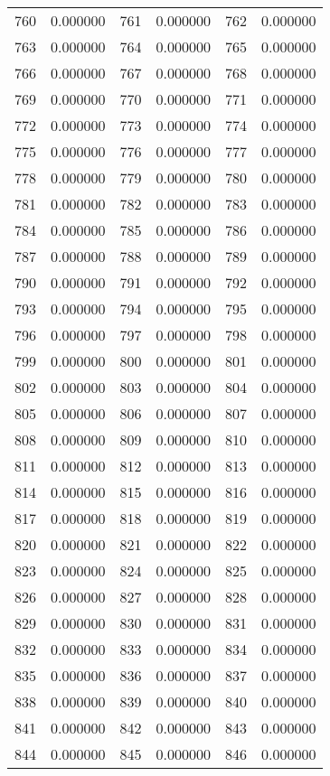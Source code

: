 \documentclass[12pt]{article}
\begin{document}
\begin{longtable}{@{}cc|cc|cc@{}}
760 & 0.000000 & 761 & 0.000000 & 762 & 0.000000 \\
763 & 0.000000 & 764 & 0.000000 & 765 & 0.000000 \\
766 & 0.000000 & 767 & 0.000000 & 768 & 0.000000 \\
769 & 0.000000 & 770 & 0.000000 & 771 & 0.000000 \\
772 & 0.000000 & 773 & 0.000000 & 774 & 0.000000 \\
775 & 0.000000 & 776 & 0.000000 & 777 & 0.000000 \\
778 & 0.000000 & 779 & 0.000000 & 780 & 0.000000 \\
781 & 0.000000 & 782 & 0.000000 & 783 & 0.000000 \\
784 & 0.000000 & 785 & 0.000000 & 786 & 0.000000 \\
787 & 0.000000 & 788 & 0.000000 & 789 & 0.000000 \\
790 & 0.000000 & 791 & 0.000000 & 792 & 0.000000 \\
793 & 0.000000 & 794 & 0.000000 & 795 & 0.000000 \\
796 & 0.000000 & 797 & 0.000000 & 798 & 0.000000 \\
799 & 0.000000 & 800 & 0.000000 & 801 & 0.000000 \\
802 & 0.000000 & 803 & 0.000000 & 804 & 0.000000 \\
805 & 0.000000 & 806 & 0.000000 & 807 & 0.000000 \\
808 & 0.000000 & 809 & 0.000000 & 810 & 0.000000 \\
811 & 0.000000 & 812 & 0.000000 & 813 & 0.000000 \\
814 & 0.000000 & 815 & 0.000000 & 816 & 0.000000 \\
817 & 0.000000 & 818 & 0.000000 & 819 & 0.000000 \\
820 & 0.000000 & 821 & 0.000000 & 822 & 0.000000 \\
823 & 0.000000 & 824 & 0.000000 & 825 & 0.000000 \\
826 & 0.000000 & 827 & 0.000000 & 828 & 0.000000 \\
829 & 0.000000 & 830 & 0.000000 & 831 & 0.000000 \\
832 & 0.000000 & 833 & 0.000000 & 834 & 0.000000 \\
835 & 0.000000 & 836 & 0.000000 & 837 & 0.000000 \\
838 & 0.000000 & 839 & 0.000000 & 840 & 0.000000 \\
841 & 0.000000 & 842 & 0.000000 & 843 & 0.000000 \\
844 & 0.000000 & 845 & 0.000000 & 846 & 0.000000 \\

\end{longtable}
\end{document}
